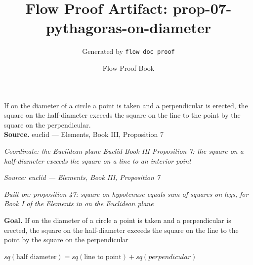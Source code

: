 \documentclass[11pt]{article}
\title{Flow Proof Artifact: prop-07-pythagoras-on-diameter}
\author{Generated by \texttt{flow doc proof}}
\date{Flow Proof Book}
\theoremstyle{definition}
\begin{document}
\maketitle
If on the diameter of a circle a point is taken and a perpendicular is erected, the square on the half-diameter exceeds the square on the line to the point by the square on the perpendicular.\\[0.5em]
\textbf{Source.} euclid — Elements, Book III, Proposition 7\\[0.5em]
\bigskip
{}\par
\smallskip\noindent\textit{Coordinate: the Euclidean plane \cdot Euclid Book III \cdot Proposition 7: the square on a half-diameter exceeds the square on a line to an interior point}\par
\smallskip\noindent\textit{Source: euclid — Elements, Book III, Proposition 7}\par
\smallskip\noindent\textit{Built on: proposition 47: square on hypotenuse equals sum of squares on legs, for Book I of the Elements in on the Euclidean plane}\par
\medskip
\noindent\textbf{Goal.} If on the diameter of a circle a point is taken and a perpendicular is erected, the square on the half-diameter exceeds the square on the line to the point by the square on the perpendicular\par
\noindent$\displaystyle sq(\text{half diameter}) = sq(\text{line to point}) + sq(perpendicular)$\par
\medskip
\noindent
\end{document}
